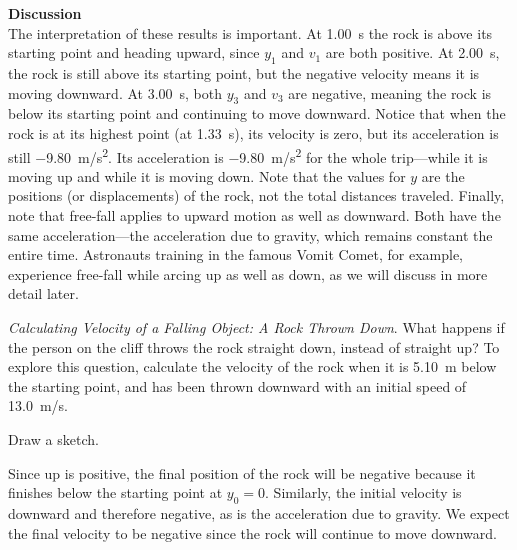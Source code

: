 \documentclass[main-ap-physics.tex]{subfiles}
\begin{document}
\textbf{Discussion}\\
The interpretation of these results is important. At \SI{1.00}{s} the rock is above its starting point and heading upward, since $y_1$ and $v_1$ are both positive. At \SI{2.00}{s}, the rock is still above its starting point, but the negative velocity means it is moving downward. At \SI{3.00}{s}, both $y_3$ and $v_3$ are negative, meaning the rock is below its starting point and continuing to move downward. Notice that when the rock is at its highest point (at \SI{1.33}{s}), its velocity is zero, but its acceleration is still \SI{-9.80}{m/s^2}. Its acceleration is \SI{-9.80}{m/s^2} for the whole trip---while it is moving up and while it is moving down. Note that the values for $y$ are the positions (or displacements) of the rock, not the total distances traveled. Finally, note that free-fall applies to upward motion as well as downward. Both have the same acceleration---the acceleration due to gravity, which remains constant the entire time. Astronauts training in the famous Vomit Comet, for example, experience free-fall while arcing up as well as down, as we will discuss in more detail later.

\endsolution

\vspace{1em} %

\begin{example}
    \textit{Calculating Velocity of a Falling Object: A Rock Thrown Down}. What happens if the person on the cliff throws the rock straight down, instead of straight up? To explore this question, calculate the velocity of the rock when it is \SI{5.10}{m} below the starting point, and has been thrown downward with an initial speed of \SI{13.0}{m/s}.
\end{example}

\Solution Draw a sketch.

\begin{center}
\end{center}

Since up is positive, the final position of the rock will be negative because it finishes below the starting point at $y_0 = 0$. Similarly, the initial velocity is downward and therefore negative, as is the acceleration due to gravity. We expect the final velocity to be negative since the rock will continue to move downward.
\end{document}
